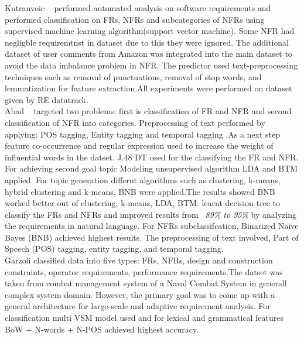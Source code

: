 Kutranvoic \etal ~ \cite {Kurtanovic:2017}performed automated analysis on
software requirements and performed classification on FRs, NFRs and
subcategories of NFRs using supervised machine learning algorithm(support vector
machine). Some NFR had negligble requiremtnst in dataset due to this they were
ignored. The additional dataset of user comments from Amazon was integrated into
the main dataset to avoid the data imbalance problem in NFR. The predictor used
text-preprocessing techniques such as removal of punctuations, removal of stop
words, and lemmatization for feature extraction.All experiments were performed
on dataset given by RE datatrack.\\

 Abad \etal ~ \cite{Abad:2017} targeted two problems: first is classification of
 FR and NFR and second classification of NFR into categories. Preprocessing of
 text performed by applying: POS tagging, Entity tagging and temporal tagging
 .As a next step feature co-occurrence and regular expression used to increase
 the weight of influential words in the datset. 
J.48 DT used for the classifying the FR and NFR. For achieving second goal topic Modeling unsupervised algorithm
 LDA and BTM applied. For topic generation differnt algorithms such as
 clustering, k-means, hybrid clustering and k-means, BNB were applied.The
 results showed BNB worked better out of clustering, k-means, LDA, BTM.
learnt decision tree to classify the FRs and NFRs and improved results from 
\emph{~89\% to 95\%} by analyzing the requirements in natural language. For NFRs
subclassifcation, Binarized Naïve Bayes (BNB) achieved highest results. The
preprocessing of text involved, Part of Speech (POS) tagging, entity tagging,
and temporal tagging.\\

Garzoli \cite {Garzoli:2013} classified data into five
types: FRs, NFRs, design and construction constraints, operator requirements,
performance requirements.The datset was taken from combat management system of a
Naval Combat System in generall complex system domain. However, the primary goal
was to come up with a general architecture for large-scale and adaptive
requirement analysis. For classification multi VSM model used and for lexical
and grammatical features BoW + N-words + N-POS achieved highest accuracy.\\

